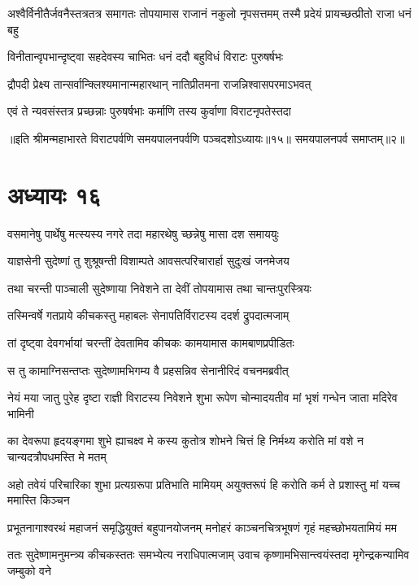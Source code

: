 \threelineshloka
{अश्वैर्विनीतैर्जवनैस्तत्रतत्र समागतः}
{तोपयामास राजानं नकुलो नृपसत्तमम्}
{तस्मै प्रदेयं प्रायच्छत्प्रीतो राजा धनं बहु}


\twolineshloka
{विनीतान्वृपभान्दृष्ट्वा सहदेवस्य चाभितः}
{धनं ददौ बहुविधं विराटः पुरुषर्षभः}


\twolineshloka
{द्रौपदी प्रेक्ष्य तान्सर्वान्क्लिश्यमानान्महारथान्}
{नातिप्रीतमना राजन्निश्वासपरमाऽभवत्}


\twolineshloka
{एवं ते न्यवसंस्तत्र प्रच्छन्नाः पुरुषर्षभाः}
{कर्माणि तस्य कुर्वाणा विराटनृपतेस्तदा}

॥इति श्रीमन्महाभारते विराटपर्वणि समयपालनपर्वणि पञ्चदशोऽध्यायः॥१५॥ समयपालनपर्व समाप्तम्॥२॥

\chapter{अध्यायः १६}

\twolineshloka
{वसमानेषु पार्थेषु मत्स्यस्य नगरे तदा}
{महारथेषु च्छन्नेषु मासा दश समाययुः}


\twolineshloka
{याज्ञसेनी सुदेष्णां तु शुश्रूषन्ती विशाम्पते}
{आवसत्परिचारार्हा सुदुःखं जनमेजय}


\twolineshloka
{तथा चरन्ती पाञ्चाली सुदेष्णाया निवेशने}
{ता देवीं तोपयामास तथा चान्तःपुरस्त्रियः}


\twolineshloka
{तस्मिन्वर्षे गतप्राये कीचकस्तु महाबलः}
{सेनापतिर्विराटस्य ददर्श द्रुपदात्मजाम्}


\twolineshloka
{तां दृष्ट्वा देवगर्भायां चरन्तीं देवतामिव}
{कीचकः कामयामास कामबाणप्रपीडितः}


\twolineshloka
{स तु कामाग्निसन्तप्तः सुदेष्णामभिगम्य वै}
{प्रहसन्निव सेनानीरिदं वचनमब्रवीत्}


\twolineshloka
{नेयं मया जातु पुरेह दृष्टा राज्ञी विराटस्य निवेशने शुभा}
{रूपेण चोन्मादयतीव मां भृशं गन्धेन जाता मदिरेव भामिनी}


\twolineshloka
{का देवरूपा हृदयङ्गमा शुभे ह्याचक्ष्व मे कस्य कुतोत्र शोभने}
{चित्तं हि निर्मथ्य करोति मां वशे न चान्यदत्रौपधमस्ति मे मतम्}


\twolineshloka
{अहो तवेयं परिचारिका शुभा प्रत्यग्ररूपा प्रतिभाति मामियम्}
{अयुक्तरूपं हि करोति कर्म ते प्रशास्तु मां यच्च ममास्ति किञ्चन}


\twolineshloka
{प्रभूतनागाश्वरथं महाजनं समृद्धियुक्तं बहुपानयोजनम्}
{मनोहरं काञ्चनचित्रभूषणं गृहं महच्छोभयतामियं मम}


\twolineshloka
{ततः सुदेष्णामनुमन्त्र्य कीचकस्ततः समभ्येत्य नराधिपात्मजाम्}
{उवाच कृष्णामभिसान्त्वयंस्तदा मृगेन्द्रकन्यामिव जम्बुको वने}


